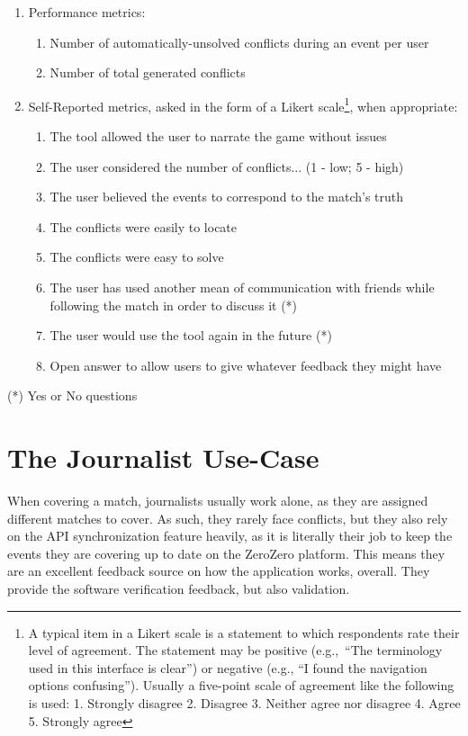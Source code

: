 \begin{enumerate}
    \item Performance metrics:
    \begin{enumerate}
        \item Number of automatically-unsolved conflicts during an event per user
        \item Number of total generated conflicts
    \end{enumerate}
    \item Self-Reported metrics, asked in the form of a Likert scale\footnote{A typical item in a Likert scale is a statement to which respondents rate
    their level of agreement. The statement may be positive (e.g.,\ “The terminology used in this interface is clear”) or negative (e.g., “I found the navigation options confusing”). Usually a five-point scale of agreement like the following is used: 1. Strongly disagree 2. Disagree 3. Neither agree nor disagree 4. Agree 5. Strongly agree}, when appropriate:
    \begin{enumerate}
        \item The tool allowed the user to narrate the game without issues
        \item The user considered the number of conflicts... (1 - low; 5 - high)
        \item The user believed the events to correspond to the match's truth 
        \item The conflicts were easily to locate
        \item The conflicts were easy to solve \\
        \item The user has used another mean of communication with friends while following the match in order to discuss it (*) 
        \item The user would use the tool again in the future (*) \\
        \item Open answer to allow users to give whatever feedback they might have
    \end{enumerate}
\end{enumerate}

(*) Yes or No questions

\section{The Journalist Use-Case}
When covering a match, journalists usually work alone, as they are assigned different matches to cover. As such, they rarely face conflicts, but they also rely on the API synchronization feature heavily, as it is literally their job to keep the events they are covering up to date on the ZeroZero platform. This means they are an excellent feedback source on how the application works, overall. They provide the software verification feedback, but also validation.

